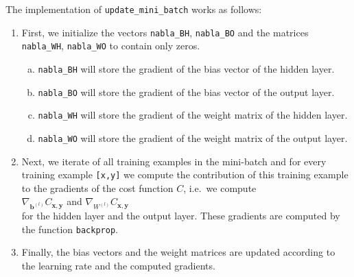 \begin{enumerate}
\begin{enumerate}
      \end{enumerate}
      The implementation of \texttt{update\_mini\_batch} works as follows:
      \begin{enumerate}
      \item First, we initialize the vectors \texttt{nabla\_BH}, \texttt{nabla\_BO} and the matrices
            \texttt{nabla\_WH}, \texttt{nabla\_WO} to contain only zeros.
            \begin{enumerate}[(a)]
            \item \texttt{nabla\_BH} will store the gradient of the bias vector of the hidden layer.
            \item \texttt{nabla\_BO} will store the gradient of the bias vector of the output layer.
            \item \texttt{nabla\_WH} will store the gradient of the weight matrix of the hidden layer.
            \item \texttt{nabla\_WO} will store the gradient of the weight matrix of the output layer.
            \end{enumerate}
      \item Next, we iterate of all training examples in the mini-batch and for every training example
            \texttt{[x,y]} we compute the contribution of this training example to the gradients of the
            cost function $C$, i.e.~we compute
            \\[0.2cm]
            \hspace*{1.3cm}
            $\nabla_{\mathbf{b}^{(l)}} C_{\mathbf{x}, \mathbf{y}}$ \quad and \quad  $\nabla_{W^{(l)}} C_{\mathbf{x},
              \mathbf{y}}$ 
            \\[0.2cm]
            for the hidden layer and the output layer.  These gradients are computed by the function
            \texttt{backprop}.
      \item Finally, the bias vectors and the weight matrices are updated according to the learning rate and the
            computed gradients.
      \end{enumerate}
\end{enumerate}


